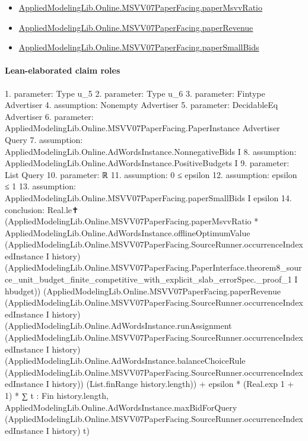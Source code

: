\documentclass[10pt]{article}
\begin{document}
\begin{itemize}
\item \hyperlink{governing-declaration-11865634591d1a39}{Applied\allowbreak{}Modeling\allowbreak{}Lib.\allowbreak{}Online.\allowbreak{}MSVV07\allowbreak{}Paper\allowbreak{}Facing.\allowbreak{}paper\allowbreak{}Msvv\allowbreak{}Ratio}
\item \hyperlink{governing-declaration-3d5795d9eda3f090}{Applied\allowbreak{}Modeling\allowbreak{}Lib.\allowbreak{}Online.\allowbreak{}MSVV07\allowbreak{}Paper\allowbreak{}Facing.\allowbreak{}paper\allowbreak{}Revenue}
\item \hyperlink{governing-declaration-486965f4d3a16406}{Applied\allowbreak{}Modeling\allowbreak{}Lib.\allowbreak{}Online.\allowbreak{}MSVV07\allowbreak{}Paper\allowbreak{}Facing.\allowbreak{}paper\allowbreak{}Small\allowbreak{}Bids}
\end{itemize}
\paragraph{Lean-elaborated claim roles}\begin{ReviewVerbatim}
1. parameter: Type u_5
2. parameter: Type u_6
3. parameter: Fintype Advertiser
4. assumption: Nonempty Advertiser
5. parameter: DecidableEq Advertiser
6. parameter: AppliedModelingLib.Online.MSVV07PaperFacing.PaperInstance Advertiser Query
7. assumption: AppliedModelingLib.Online.AdWordsInstance.NonnegativeBids I
8. assumption: AppliedModelingLib.Online.AdWordsInstance.PositiveBudgets I
9. parameter: List Query
10. parameter: ℝ
11. assumption: 0 ≤ epsilon
12. assumption: epsilon ≤ 1
13. assumption: AppliedModelingLib.Online.MSVV07PaperFacing.paperSmallBids I epsilon
14. conclusion: Real.le✝
  (AppliedModelingLib.Online.MSVV07PaperFacing.paperMsvvRatio *
    AppliedModelingLib.Online.AdWordsInstance.offlineOptimumValue
      (AppliedModelingLib.Online.MSVV07PaperFacing.SourceRunner.occurrenceIndexedInstance I history)
      (AppliedModelingLib.Online.MSVV07PaperFacing.PaperInterface.theorem8_source_unit_budget_finite_competitive_with_explicit_slab_errorSpec._proof_1
        I hbudget))
  (AppliedModelingLib.Online.MSVV07PaperFacing.paperRevenue
      (AppliedModelingLib.Online.MSVV07PaperFacing.SourceRunner.occurrenceIndexedInstance I history)
      (AppliedModelingLib.Online.AdWordsInstance.runAssignment
        (AppliedModelingLib.Online.MSVV07PaperFacing.SourceRunner.occurrenceIndexedInstance I history)
        (AppliedModelingLib.Online.AdWordsInstance.balanceChoiceRule
          (AppliedModelingLib.Online.MSVV07PaperFacing.SourceRunner.occurrenceIndexedInstance I history))
        (List.finRange history.length)) +
    epsilon * (Real.exp 1 + 1) *
      ∑ t : Fin history.length,
        AppliedModelingLib.Online.AdWordsInstance.maxBidForQuery
          (AppliedModelingLib.Online.MSVV07PaperFacing.SourceRunner.occurrenceIndexedInstance I history) t)
\end{ReviewVerbatim}
\end{document}

